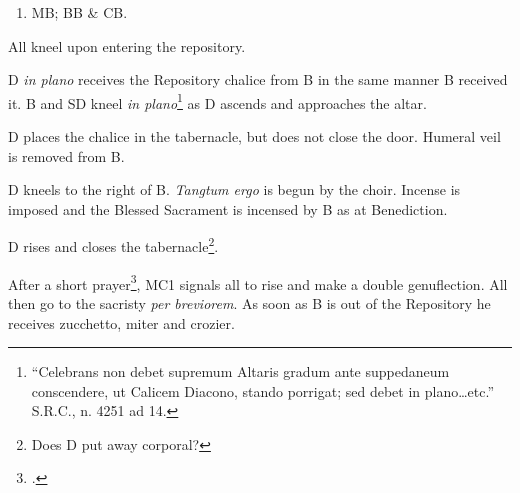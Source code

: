 {\begin{enumerate}
    \item MB; BB \& CB.

\end{enumerate}

\rubric All kneel upon entering the repository.

\rubric D \textit{in plano} receives the Repository chalice from B in the same
manner B received it. B and SD kneel \textit{in plano}\footnote{``Celebrans non
debet supremum Altaris gradum ante suppedaneum conscendere, ut Calicem Diacono,
stando porrigat; sed debet in plano\dots etc.'' S.R.C., n. 4251 ad 14.} as D
ascends and approaches the altar.

\rubric D places the chalice in the tabernacle, but does not close the door.
Humeral veil is removed from B.

\rubric D kneels to the right of B. \textit{Tangtum ergo} is begun by the
choir. Incense is imposed and the Blessed Sacrament is incensed by B as at
Benediction.

\rubric D rises and closes the tabernacle\footnote{Does D put away corporal?}.

\rubric After a short prayer\footcite[B is instructed to give a blessing at
this point with miter and crozier. Is this reserved to the Ordinary?][p.
192]{stehle}, MC1 signals all to rise and make a double genuflection. All then
go to the sacristy \textit{per breviorem}. As soon as B is out of the
Repository he receives zucchetto, miter and crozier.

}
